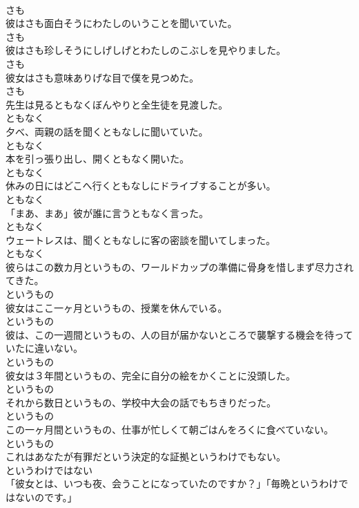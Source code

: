 \documentclass[8pt]{extreport}
\begin{document}
\begin{CJK}{UTF8}{min}
\\	さも
\\	彼はさも面白そうにわたしのいうことを聞いていた。	
\\	さも
\\	彼はさも珍しそうにしげしげとわたしのこぶしを見やりました。	
\\	さも
\\	彼女はさも意味ありげな目で僕を見つめた。	
\\	さも
\\	先生は見るともなくぼんやりと全生徒を見渡した。	
\\	ともなく
\\	夕べ、両親の話を聞くともなしに聞いていた。	
\\	ともなく
\\	本を引っ張り出し、開くともなく開いた。	
\\	ともなく
\\	休みの日にはどこへ行くともなしにドライブすることが多い。	
\\	ともなく
\\	「まあ、まあ」彼が誰に言うともなく言った。	
\\	ともなく
\\	ウェートレスは、聞くともなしに客の密談を聞いてしまった。	
\\	ともなく
\\	彼らはこの数カ月というもの、ワールドカップの準備に骨身を惜しまず尽力されてきた。	
\\	というもの
\\	彼女はここ一ヶ月というもの、授業を休んでいる。	
\\	というもの
\\	彼は、この一週間というもの、人の目が届かないところで襲撃する機会を待っていたに違いない。	
\\	というもの
\\	彼女は３年間というもの、完全に自分の絵をかくことに没頭した。	
\\	というもの
\\	それから数日というもの、学校中大会の話でもちきりだった。	
\\	というもの
\\	この一ヶ月間というもの、仕事が忙しくて朝ごはんをろくに食べていない。	
\\	というもの
\\	これはあなたが有罪だという決定的な証拠というわけでもない。	
\\	というわけではない
\\	「彼女とは、いつも夜、会うことになっていたのですか？」「毎晩というわけではないのです。」	

\end{CJK}
\end{document}
